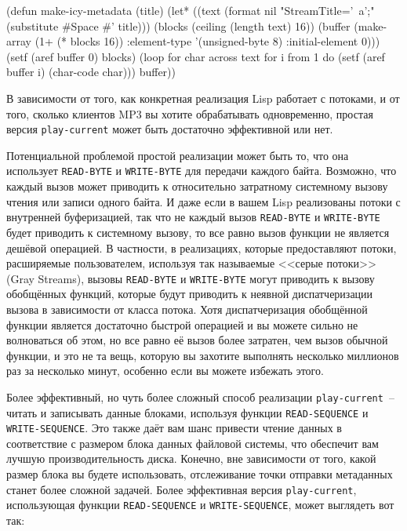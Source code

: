 \begin{myverb}
(defun make-icy-metadata (title)
  (let* ((text (format nil "StreamTitle='~a';" (substitute #\bslash{}Space #\bslash{}' title)))
         (blocks (ceiling (length text) 16))
         (buffer (make-array (1+ (* blocks 16))
                             :element-type '(unsigned-byte 8)
                             :initial-element 0)))
    (setf (aref buffer 0) blocks)
    (loop 
       for char across text
       for i from 1 
       do (setf (aref buffer i) (char-code char)))
    buffer))
\end{myverb}

В зависимости от того, как конкретная реализация Lisp работает с потоками, и от того,
сколько клиентов MP3 вы хотите обрабатывать одновременно, простая версия
\lstinline{play-current} может быть достаточно эффективной или нет.

Потенциальной проблемой простой реализации может быть то, что она использует
\lstinline{READ-BYTE} и \lstinline{WRITE-BYTE} для передачи каждого байта. Возможно, что каждый
вызов может приводить к относительно затратному системному вызову чтения или записи одного
байта.  И даже если в вашем Lisp реализованы потоки с внутренней буферизацией, так что не
каждый вызов \lstinline{READ-BYTE} и \lstinline{WRITE-BYTE} будет приводить к системному вызову, то
все равно вызов функции не является дешёвой операцией.  В частности, в реализациях,
которые предоставляют потоки, расширяемые пользователем, используя так называемые <<серые
потоки>> (Gray Streams), вызовы \lstinline{READ-BYTE} и \lstinline{WRITE-BYTE} могут приводить к
вызову обобщённых функций, которые будут приводить к неявной диспатчеризации вызова в
зависимости от класса потока.  Хотя диспатчеризация обобщённой функции является достаточно
быстрой операцией и вы можете сильно не волноваться об этом, но все равно её вызов более
затратен, чем вызов обычной функции, и это не та вещь, которую вы захотите выполнять
несколько миллионов раз за несколько минут, особенно если вы можете избежать этого.

Более эффективный, но чуть более сложный способ реализации \lstinline{play-current}~-- читать и
записывать данные блоками, используя функции \lstinline{READ-SEQUENCE} и \lstinline{WRITE-SEQUENCE}.
Это также даёт вам шанс привести чтение данных в соответствие с размером блока данных
файловой системы, что обеспечит вам лучшую производительность диска.  Конечно, вне
зависимости от того, какой размер блока вы будете использовать, отслеживание точки
отправки метаданных станет более сложной задачей.  Более эффективная версия
\lstinline{play-current}, использующая функции \lstinline{READ-SEQUENCE} и \lstinline{WRITE-SEQUENCE},
может выглядеть вот так:

